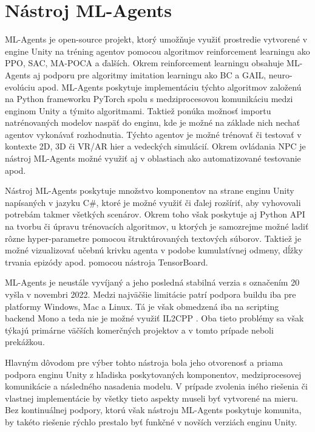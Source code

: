 \documentclass[slovak, master]{diploma}
\begin{document}
\section{Nástroj ML-Agents}
\label{sec:ML-Agents}
ML-Agents \cite{mlagents} je open-source projekt, ktorý umožňuje využiť prostredie vytvorené v engine Unity na tréning agentov pomocou algoritmov reinforcement learningu ako PPO, SAC, MA-POCA a ďalších. Okrem reinforcement learningu obsahuje ML-Agents aj podporu pre algoritmy imitation learningu ako BC a GAIL, neuro-evolúciu apod. ML-Agents poskytuje implementáciu týchto algoritmov založenú na Python frameworku PyTorch spolu s medziprocesovou komunikáciu medzi enginom Unity a týmito algoritmami. Taktiež ponúka možnosť importu natrénovaných modelov naspäť do enginu, kde je možné na základe nich nechať agentov vykonávať rozhodnutia. Týchto agentov je možné trénovať či testovať v kontexte 2D, 3D či VR/AR hier a vedeckých simulácií. Okrem ovládania NPC je nástroj ML-Agents možné využiť aj v oblastiach ako automatizované testovanie apod.

Nástroj ML-Agents poskytuje množstvo komponentov na strane enginu Unity napísaných v jazyku C\#, ktoré je možné využiť či ďalej rozšíriť, aby vyhovovali potrebám takmer všetkých scenárov. Okrem toho však poskytuje aj Python API na tvorbu či úpravu trénovacích algoritmov, u ktorých je samozrejme možné ladiť rôzne hyper-parametre pomocou štruktúrovaných textových súborov. Taktiež je možné vizualizovať učebnú krivku agenta v podobe kumulatívnej odmeny, dĺžky trvania epizódy apod. pomocou nástroja TensorBoard.

ML-Agents je neustále vyvíjaný a jeho posledná stabilná verzia s označením 20 vyšla v novembri 2022. Medzi najväčšie limitácie patrí podpora buildu iba pre platformy Windows, Mac a Linux. Tá je však obmedzená iba na scripting backend Mono a teda nie je možné využiť IL2CPP \cite{mlagentsGit}. Oba tieto problémy sa však týkajú primárne väčších komerčných projektov a v tomto prípade neboli prekážkou.

Hlavným dôvodom pre výber tohto nástroja bola jeho otvorenosť a priama podpora enginu Unity z hľadiska poskytovaných komponentov, medziprocesovej komunikácie a následného nasadenia modelu. V prípade zvolenia iného riešenia či vlastnej implementácie by všetky tieto aspekty museli byť vytvorené na mieru. Bez kontinuálnej podpory, ktorú však nástroju ML-Agents poskytuje komunita, by takéto riešenie rýchlo prestalo byť funkčné v novších verziách enginu Unity.
\end{document}
